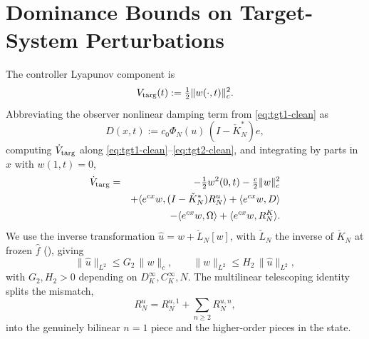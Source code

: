 \documentclass[journal,twoside,web]{ieeecolor}
\begin{document}
\section{Dominance Bounds on Target-System Perturbations}\label{sec:proof-dominance}

The controller Lyapunov component is
\begin{equation}\label{eq:W-def}
V_{\rm targ}(t):=\tfrac12\|w(\cdot,t)\|_c^2.
\end{equation}
Abbreviating the observer nonlinear damping term from \eqref{eq:tgt1-clean} as
\begin{equation}\label{eq:D-def}
D(x,t):=c_0\Phi_N(u)\,(I-\check K_N^*)e,
\end{equation}
computing $\dot V_{\rm targ}$ along \eqref{eq:tgt1-clean}--\eqref{eq:tgt2-clean}, and integrating by parts in $x$ with $w(1,t)=0$,
\begin{eqnarray}
\dot V_{\rm targ} &=& -\tfrac12 w^2(0,t)-\tfrac{c}{2}\|w\|_c^2 \nonumber\\
&& +\langle e^{cx}w,(I-\check K_N^*)R^u_N\rangle+\langle e^{cx}w,D\rangle \nonumber\\
&& -\langle e^{cx}w,\Omega\rangle+\langle e^{cx}w,R^K_N\rangle. \label{eq:Wdot-expand}
\end{eqnarray}
We use the inverse transformation $\hat u=w+\check L_N[w]$, with $\check L_N$ the inverse of $\check K_N$ at frozen $\hat f$ (\cite[Lemma~10]{HV2}), giving
\begin{equation}\label{eq:inverse-transform}
\|\hat u\|_{L^2}\le G_2\,\|w\|_c,\qquad \|w\|_{L^2}\le H_2\,\|\hat u\|_{L^2},
\end{equation}
with $G_2,H_2>0$ depending on $D_K^\infty,C_K^\infty,N$. The multilinear telescoping identity \cite[eq.~(37)]{HV2} splits the mismatch,
\begin{equation}\label{eq:Ru-split}
R^u_N=R^{u,1}_N+\sum_{n\ge 2}R^{u,n}_N,
\end{equation}
into the genuinely bilinear $n=1$ piece and the higher-order pieces in the state.
\end{document}
